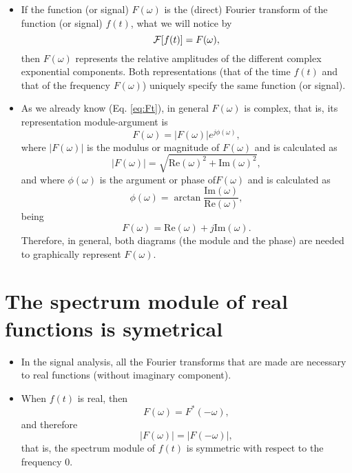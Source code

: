 \begin{itemize}
\item If the function (or signal) $F(\omega)$ is the (direct) Fourier
  transform of the function (or signal) $f(t)$, what we will notice by
  \begin{equation*}
    {\cal{F}}[f(t)] = F(\omega),
  \end{equation*}
  then $F(\omega)$ represents the relative amplitudes of the different
  complex exponential components. Both representations (that of the
  time $f(t)$ and that of the frequency $F(\omega)$) uniquely specify the
  same function (or signal).
\item As we already know (Eq. \ref{eq:Ft}), in general $F(\omega)$ is
  complex, that is, its representation module-argument is
  \begin{equation*}
    F(\omega) = |F(\omega)|e^{j\phi(\omega)},
  \end{equation*}
  where $|F(\omega)|$ is the modulus or magnitude of $F(\omega)$ and
  is calculated as
  \begin{equation*}
    |F(\omega)| = \sqrt{\mathrm{Re}(\omega)^2+\mathrm{Im}(\omega)^2},
  \end{equation*}
  and where $\phi(\omega)$ is the argument or phase of$F(\omega)$ and
  is calculated as
  \begin{equation*}
    \phi(\omega) = \arctan\frac{\mathrm{Im}(\omega)}{\mathrm{Re}(\omega)},
  \end{equation*}
  being
  \begin{equation*}
    F(\omega) = \mathrm{Re}(\omega) + j\mathrm{Im}(\omega).
  \end{equation*}
  Therefore, in general, both diagrams (the module and the phase) are
  needed to graphically represent $F(\omega)$.
\end{itemize}

\section{The spectrum module of real functions is symetrical}
\begin{itemize}
\item In the signal analysis, all the Fourier transforms that are made
  are necessary to real functions (without imaginary component).
\item When $f(t)$ is real, then
  \begin{equation*}
    F(\omega)=F^*(-\omega),
  \end{equation*}
  and therefore
  \begin{equation*}
    |F(\omega)|=|F(-\omega)|,
  \end{equation*}
  that is, the spectrum module of $f(t)$ is symmetric with respect to
  the frequency $0$.
\end{itemize}
